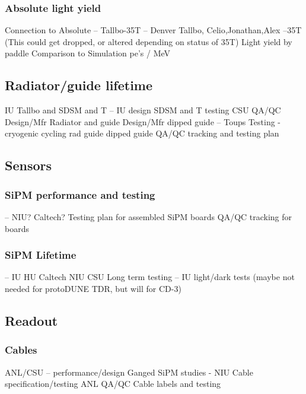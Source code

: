 \subsubsection{ Absolute light yield}
     Connection to Absolute -- Tallbo-35T  -- Denver Tallbo, Celio,Jonathan,Alex --35T
     (This could get dropped, or altered depending on status of 35T)
     Light yield by paddle
     Comparison to Simulation
     pe's / MeV 

\subsection{Radiator/guide lifetime}
     IU Tallbo and SDSM and T  -- IU design SDSM and T testing  CSU QA/QC
     Design/Mfr Radiator and guide
     Design/Mfr dipped guide -- Toups
     Testing - cryogenic cycling 
          rad
          guide
          dipped guide
     QA/QC tracking and testing plan  

\subsection{Sensors}

\subsubsection{SiPM performance and testing}
      -- NIU? Caltech?
     Testing plan for assembled SiPM boards
     QA/QC tracking for boards     

\subsubsection{SiPM Lifetime}
      -- IU HU Caltech NIU CSU 
     Long term testing -- IU light/dark tests     
     (maybe not needed for protoDUNE TDR, but will for CD-3)

\subsection{Readout}

\subsubsection{Cables}
     ANL/CSU -- performance/design 
     Ganged SiPM studies - NIU
     Cable specification/testing ANL
     QA/QC Cable labels and testing

